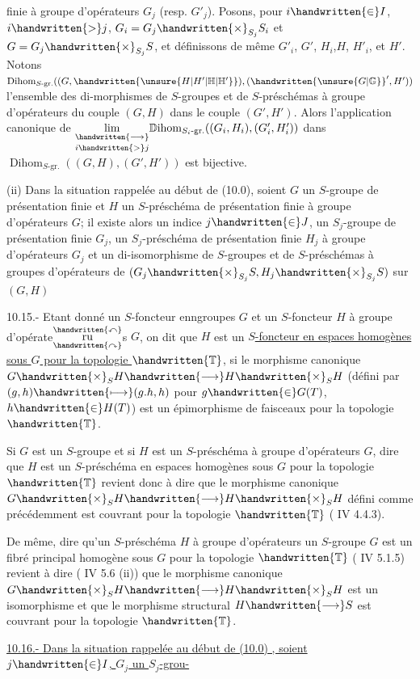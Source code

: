 finie à groupe d'opérateurs $G_j$ (resp. $G'_j$). Posons, pour $i\handwritten{\in}I$, $i\handwritten{>}j$, $G_i=G_j\handwritten{\times}_{S_j}S_i$ et $G=G_j\handwritten{\times}_{S_j}S$, et définissons de même $G'_i$, $G'$, $H_i$,$H$, $H'_i$, et $H'$. Notons $\operatorname{Dihom}_{S\text{-gr.}}((G,\handwritten{\unsure{H|H'|\mathbb{H}|\mathbb{H}'}}),(\handwritten{\unsure{G|\mathbb{G}}}',H'))$ l'ensemble des di-morphismes de $S$-groupes et de $S$-préschémas à groupe d'opérateurs du couple $(G,H)$ dans le couple $(G',H')$. Alors l'application canonique de $\underset{i\handwritten{>}j}{\underset{\handwritten{\longrightarrow}}{\lim}}{\mathbb{D}\mathrm{ihom}}_{S_i\text{-gr.}}((G_i,H_i),(G'_i,H'_i))$ dans $\operatorname{Dihom}_{S\text{-gr.}}((G,H),(G',H'))$ est bijective.

(ii) Dans la situation rappelée au début de (10.0), soient $G$ un $S$-groupe  de présentation finie et $H$ un $S$-préschéma de présentation finie à groupe d'opérateurs $G$; il existe alors un indice $j\handwritten{\in}J$, un $S_j$-groupe de présentation finie $G_j$, un $S_j$-préschéma de présentation finie $H_j$ à groupe d'opérateurs $G_j$ et un di-isomorphisme de $S$-groupes et de $S$-préschémas à groupes d'opérateurs de $(G_j\handwritten{\times}_{S_j}S,H_j\handwritten{\times}_{S_j}S)$ sur$(G,H)$

 10.15.- Etant donné un $S$-foncteur enngroupes $G$ et un $S$-foncteur $H$ à groupe d'opérate$\overset{\handwritten{\curvearrowleft}}{\underset{\handwritten{\curvearrowright}}{\mathrm{ru}}}$s $G$, on dit que $H$ est un \uline{$S$-foncteur en espaces homogènes sous $G$ pour la topologie $\handwritten{\mathbb{T}}$}, si le morphisme canonique $G\handwritten{\times}_S H\handwritten{\longrightarrow}H\handwritten{\times}_S H$ (défini par $(g,h)\handwritten{\longmapsto}(g.h,h)$ pour $g\handwritten{\in}G(T)$, $h\handwritten{\in}H(T)$) est un épimorphisme de faisceaux pour la topologie $\handwritten{\mathbb{T}}$.

Si $G$ est un $S$-groupe et si $H$ est un $S$-préschéma à  groupe d'opérateurs $G$, dire que $H$ est un $S$-préschéma en espaces homogènes sous $G$ pour la topologie $\handwritten{\mathbb{T}}$ revient donc à dire que le morphisme canonique $G\handwritten{\times}_S H\handwritten{\longrightarrow}H\handwritten{\times}_S H$ défini comme précédemment est couvrant pour la topologie $\handwritten{\mathbb{T}}$ ( IV 4.4.3).

De même, dire qu'un $S$-préschéma $H$ à groupe d'opérateurs un $S$-groupe $G$ est un fibré principal homogène sous $G$ pour la topologie $\handwritten{\mathbb{T}}$ ( IV 5.1.5) revient à dire ( IV 5.6 (ii)) que le morphisme canonique $G\handwritten{\times}_S H\handwritten{\longrightarrow}H\handwritten{\times}_S H$ est un isomorphisme et que le morphisme structural $H\handwritten{\longrightarrow}S$ est couvrant pour la topologie $\handwritten{\mathbb{T}}$.

\uline{10.16.- Dans la situation rappelée au début de (10.0) , soient $j\handwritten{\in}I$, $G_j$ un $S_j$-grou-}
